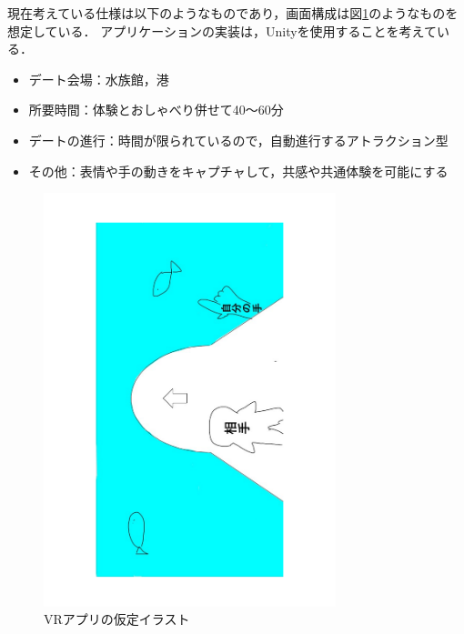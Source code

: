 \documentclass[12pt]{ltjsarticle}
\begin{document}
現在考えている仕様は以下のようなものであり，画面構成は図\ref{fig:イラスト}のようなものを想定している．
アプリケーションの実装は，Unityを使用することを考えている．

\begin{itemize}
\item デート会場：水族館，港
\item 所要時間：体験とおしゃべり併せて40〜60分
\item デートの進行：時間が限られているので，自動進行するアトラクション型
\item その他：表情や手の動きをキャプチャして，共感や共通体験を可能にする
\end{itemize}





\begin{figure}[h]
\begin{center}
 \includegraphics[width=85mm]{irasuto.jpg.pdf}
\end{center}
 \caption{VRアプリの仮定イラスト}
 \label{fig:イラスト}
\end{figure}
\end{document}
